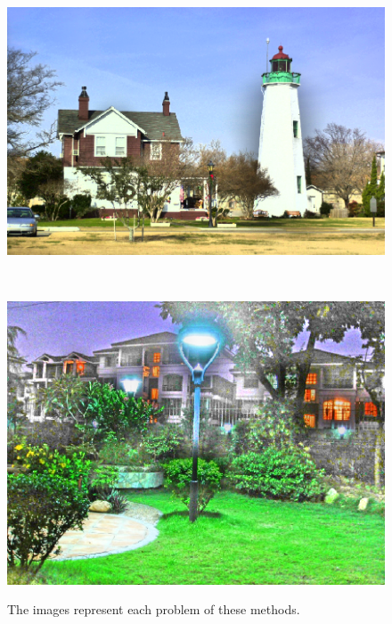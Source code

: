 \begin{figure}[t]
	\begin{minipage}[b]{1.0\hsize}
		\centering
		\includegraphics[width=0.65\hsize]{images/problems/srie/reflectance.eps}
		 \label{fig:problem/srie/reflectance}
	\end{minipage}\\
	\begin{minipage}[b]{1.0\hsize}
		\centering
		\includegraphics[width=0.65\hsize]{images/problems/jiep/reflectance.eps}
		 \label{fig:problem/jiep/reflectance}
	\end{minipage}
	\caption{The images represent each problem of these methods.}
	\label{fig:problems}
\end{figure}